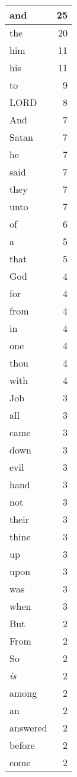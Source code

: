 \begin{center}
\begin{longtable}{l|r}
\hline \hline
\endlastfoot
and & 25 \\ \hline
the & 20 \\ \hline
him & 11 \\ \hline
his & 11 \\ \hline
to & 9 \\ \hline
LORD & 8 \\ \hline
And & 7 \\ \hline
Satan & 7 \\ \hline
he & 7 \\ \hline
said & 7 \\ \hline
they & 7 \\ \hline
unto & 7 \\ \hline
of & 6 \\ \hline
a & 5 \\ \hline
that & 5 \\ \hline
God & 4 \\ \hline
for & 4 \\ \hline
from & 4 \\ \hline
in & 4 \\ \hline
one & 4 \\ \hline
thou & 4 \\ \hline
with & 4 \\ \hline
Job & 3 \\ \hline
all & 3 \\ \hline
came & 3 \\ \hline
down & 3 \\ \hline
evil & 3 \\ \hline
hand & 3 \\ \hline
not & 3 \\ \hline
their & 3 \\ \hline
thine & 3 \\ \hline
up & 3 \\ \hline
upon & 3 \\ \hline
was & 3 \\ \hline
when & 3 \\ \hline
But & 2 \\ \hline
From & 2 \\ \hline
So & 2 \\ \hline
\emph{is} & 2 \\ \hline
among & 2 \\ \hline
an & 2 \\ \hline
answered & 2 \\ \hline
before & 2 \\ \hline
come & 2 \\ \hline

\end{longtable}
\end{center}
